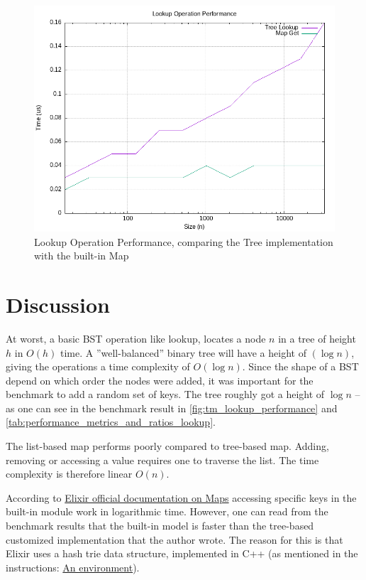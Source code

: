 \documentclass[a4paper,11pt]{article}
\begin{document}
    \begin{figure}[h]
        \centering
        \includegraphics[width=\textwidth]{../data/tm_lookup_performance.png}
        \caption{Lookup Operation Performance, comparing the Tree implementation with the built-in Map}
        \label{fig:tm_lookup_performance}
    \end{figure}

\section*{Discussion}
\label{sec:discussion}
At worst, a basic BST operation like lookup,
locates a node $n$ in a tree
of height $h$ in $O(h)$ time.
A ''well-balanced'' binary tree will have a height of $(\log n)$,
giving the operations a time complexity of $O(\log n)$.
Since the shape of a BST depend on which order the nodes were
added, it was important for the benchmark to add a random set of keys.
The tree roughly got a height of $\log n$ -- as one can see in the benchmark
result in \autoref{fig:tm_lookup_performance} and \autoref{tab:performance_metrics_and_ratios_lookup}.

The list-based map performs poorly compared to tree-based map.
Adding, removing or accessing a value requires one to traverse the list.
The time complexity is therefore linear $O(n)$.

According to
\href{https://hexdocs.pm/elixir/1.12/Map.html}{Elixir official documentation on Maps}
accessing specific keys in the
built-in module work in logarithmic time.
    However, one can read from the benchmark results that the built-in model
    is faster than the tree-based customized implementation that the author wrote.
    The reason for this is that Elixir uses a hash trie data structure,
    implemented in C++ (as mentioned in the instructions:
\href{https://people.kth.se/~johanmon/courses/id1019/seminars/environment/environment.pdf}{An environment}).
\end{document}
